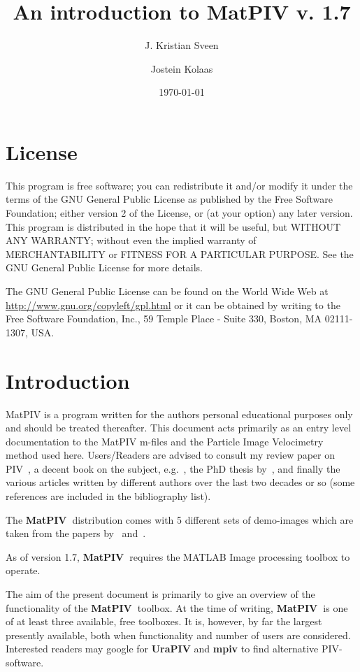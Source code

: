 \documentclass{book}
\title{An introduction to {\bf MatPIV} v. 1.7}
\author[1,2]{J. Kristian Sveen}
\author[1]{Jostein Kolaas}
\affil[1]{University of Oslo, Department of Mathematics, Section for Mechanics, Norway}
\affil[2]{Process Technology and Fluid Flow Department, Institute for Energy Technology, Norway}
\date{\today}
\newcommand{\matpiv}{{\bf MatPIV~}}
\begin{document}
\maketitle


\chapter*{License}

This program is free software; you can redistribute it and/or modify it
under the terms of the GNU General Public License as published by the
Free Software Foundation; either version 2 of the License, or (at your
option) any later version. This program is distributed in the hope that
it will be useful, but WITHOUT ANY WARRANTY; without even the implied
warranty of MERCHANTABILITY or FITNESS FOR A PARTICULAR PURPOSE. See the
GNU General Public License for more details.

The GNU General Public License can be found on the World Wide Web at
\url{http://www.gnu.org/copyleft/gpl.html} or it can be obtained by writing to
the Free Software Foundation, Inc., 59 Temple Place - Suite 330, Boston,
MA 02111-1307, USA.




\tableofcontents

\chapter*{Introduction}

MatPIV is a program written for the authors personal educational
purposes only and should be treated thereafter. This document acts
primarily as an entry level documentation to the MatPIV m-files and the
Particle Image Velocimetry method used here. Users/Readers are advised
to consult my review paper on PIV~\citep{Sveen:2004}, a decent book on the
subject, e.g.~\cite{Raffel:1998}, the PhD thesis
by~\cite{Westerweel:1993}, and finally the various articles written by
different authors over the last two decades or so (some references are
included in the bibliography list). 

The \matpiv distribution comes with 5 different sets of demo-images
which are taken from the papers by~\cite{Grue:1999}
and~\cite{Jensen:1999}.

As of version 1.7, \matpiv requires the MATLAB Image processing toolbox to operate.

The aim of the present document is primarily to give an overview of the
functionality of the \matpiv toolbox. At the time of writing, \matpiv is
one of at least three available, free toolboxes. It is, however, by far
the largest presently available, both when functionality and number of
users are considered. Interested readers may google for {\bf UraPIV} and
{\bf mpiv} to find alternative PIV-software.
\end{document}
